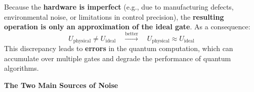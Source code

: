 Because the \textbf{hardware is imperfect} (e.g., due to manufacturing defects, environmental noise, or limitations in control precision), the \textbf{resulting operation is only an approximation of the ideal gate}. As a consequence:
\begin{equation*}
    U_{\text{physical}} \ne U_{\text{ideal}} \quad \xrightarrow{\text{better}} \quad U_{\text{physical}} \approx U_{\text{ideal}}
\end{equation*}
This discrepancy leads to \textbf{errors} in the quantum computation, which can accumulate over multiple gates and degrade the performance of quantum algorithms.

\newpage

\begin{flushleft}
    \textcolor{Red2}{ \textbf{The Two Main Sources of Noise}}
\end{flushleft}
